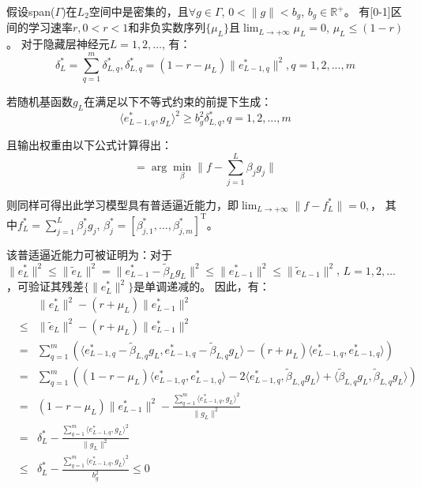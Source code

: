 假设span($\Gamma$)在$L_2$空间中是密集的，且$\forall g\in \Gamma$, $0<\|g\|<b_g$, $b_g\in \mathbb{R}^{+}$。
有[0-1]区间的学习速率$r, 0<r<1$和非负实数序列$\{\mu_L\}$且$\lim_{L\rightarrow+\infty}\mu_L=0$, 
$\mu_L\leq (1-r)$。
对于隐藏层神经元$L=1,2,\ldots$, 有：
\begin{equation}
    \delta_{L}^{*}=\sum_{q=1}^{m}\delta_{L,q}^{*}, \delta_{L,q}^{*}=(1-r-\mu_L)\|e_{L-1,q}^{*}\|^2, q=1,2,...,m
    \end{equation}

若随机基函数$g_L$在满足以下不等式约束的前提下生成：
\begin{equation}\label{step3}
\langle e_{L-1,q}^{*},g_L\rangle^2\geq b_g^2\delta_{L,q}^{*}, q=1,2,...,m
\end{equation}

且输出权重由以下公式计算得出：
\begin{equation}
    [\beta_1^{*}, \beta_2^{*},\ldots,\beta_{L}^{*}] = \arg \min_{\beta}\|f-\sum_{j=1}^{L}\beta_jg_j\| \label{step4}
\end{equation}

则同样可得出此学习模型具有普适逼近能力，即$\lim_{L\rightarrow +\infty}\|f-f_L^{*}\|=0,$，
其中$f_L^{*}=\sum_{j=1}^{L}\beta_{j}^{*}g_j$, $\beta_{j}^{*}=[\beta^{*}_{j,1},\ldots,\beta^{*}_{j,m}]^{\mathrm{T}}$。

该普适逼近能力可被证明为：对于$\|e_{L}^{*}\|^2\leq \|\tilde{e}_{L}\|^2=\|e_{L-1}^{*}-\tilde{\beta}_{L}g_L\|^2\leq \|e_{L-1}^{*}\|^2\leq \|\tilde{e}_{L-1}\|^2$, $L=1,2,\ldots$
，可验证其残差$\{\|e_{L}^{*}\|^2\}$是单调递减的。
因此，有：
\begin{eqnarray}
    &&\|e_L^{*}\|^2-(r+\mu_L)\|e_{L-1}^{*}\|^2\nonumber\\&\leq&\|\tilde{e}_{L}\|^2-(r+\mu_L)\|e_{L-1}^{*}\|^2\nonumber\\
    &=&\sum_{q=1}^{m}\left(\langle e_{L-1,q}^{*}-\tilde{\beta}_{L,q}g_L,e_{L-1,q}^{*}-\tilde{\beta}_{L,q}g_L\rangle-(r+\mu_L)\langle e_{L-1,q}^{*},e_{L-1,q}^{*}\rangle\right)\nonumber\\
    &=&\sum_{q=1}^{m}\left((1-r-\mu_L)\langle e_{L-1,q}^{*},e_{L-1,q}^{*}\rangle-2\langle e_{L-1,q}^{*},\tilde{\beta}_{L,q}g_L\rangle+\langle\tilde{\beta}_{L,q}g_L,\tilde{\beta}_{L,q}g_L\rangle\right)\nonumber\\
    &=&(1-r-\mu_L)\|e_{L-1}^{*}\|^2-\frac{\sum_{q=1}^{m}\langle e_{L-1,q}^{*},g_L\rangle^2}{\|g_L\|^2}\nonumber\\
    &=&\delta_L^{*}-\frac{\sum_{q=1}^{m}\langle e_{L-1,q}^{*},g_L\rangle^2}{\|g_L\|^2}\nonumber\\
    &\leq& \delta_L^{*}-\frac{\sum_{q=1}^{m}\langle e_{L-1,q}^{*},g_L\rangle^2}{b_g^2}\leq0
\end{eqnarray}


